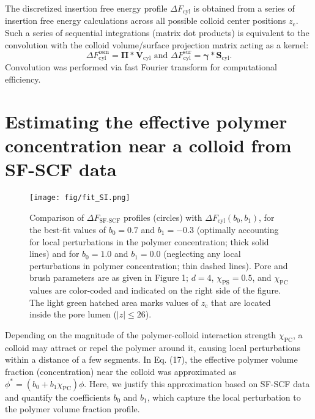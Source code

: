\documentclass[10pt, a4paper, twocolumn]{article}
\begin{document}
The discretized insertion free energy profile $\Delta F_{\text{cyl}}$ is obtained from a series of insertion free energy calculations across all possible colloid center positions $z_{\text{c}}$.
Such a series of sequential integrations (matrix dot products) is equivalent to the convolution with the colloid volume/surface projection matrix acting as a kernel:
\begin{equation*}
    \Delta F_{\text{cyl}}^{\text{osm}} = \boldsymbol{\Pi} \ast \bm{V}_{\text{cyl}} \text{ and }
    \Delta F_{\text{cyl}}^{\text{sur}} = \boldsymbol{\gamma} \ast \bm{S}_{\text{cyl}}.
\end{equation*}
Convolution was performed via fast Fourier transform for computational efficiency.




\section{Estimating the effective polymer concentration near a colloid from SF-SCF data}

\begin{figure}[]
    \centering
    \texttt{[image: fig/fit\_SI.png]}
    \caption{
    Comparison of $\Delta F_{\text{SF-SCF}}$ profiles (circles) with $\Delta F_{\text{cyl}}(b_0,b_1)$, for the best-fit values of $b_0 = 0.7$ and $b_1 = -0.3$ (optimally accounting for local perturbations in the polymer concentration; thick solid lines) and for $b_0 = 1.0$ and $b_1 = 0.0$ (neglecting any local perturbations in polymer concentration; thin dashed lines).
    Pore and brush parameters are as given in Figure 1; $d = 4$, $\chi_{\text{PS}} = 0.5$, and $\chi_{\text{PC}}$ values are color-coded and indicated on the right side of the figure.
    The light green hatched area marks values of $z_{\text{c}}$ that are located inside the pore lumen ($|z| \leq 26$).
    }
    \label{fig:fit_SI}
\end{figure}

Depending on the magnitude of the polymer-colloid interaction strength $\chi_{\text{PC}}$, a colloid may attract or repel the polymer around it, causing local perturbations within a distance of a few segments.
In Eq. (17), the effective polymer volume fraction (concentration) near the colloid was approximated as $\phi^{\ast} = (b_0 + b_1 \chi_{\text{PC}}) \phi$.
Here, we justify this approximation based on SF-SCF data and quantify the coefficients $b_0$ and $b_1$, which capture the local perturbation to the polymer volume fraction profile.
\end{document}
